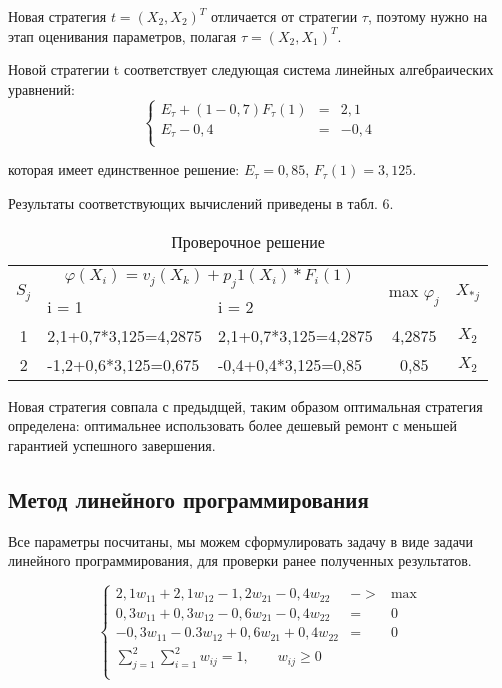 Новая стратегия $t = (X_2, X_2)^T$ отличается от стратегии $\tau$, поэтому нужно на этап оценивания параметров, полагая $\tau = (X_2, X_1)^T$.

Новой стратегии t соответствует следующая система линейных алгебраических уравнений:
$$
\left\{
	\begin{aligned}
	E_\tau + (1 - 0,7) F_\tau(1) &= & 2,1\\
	E_\tau - 0,4 &= & -0,4\\
	\end{aligned}
\right.
$$

которая имеет единственное решение: $E_\tau = 0,85$, $F_\tau(1) = 3,125$.

Результаты соответствующих вычислений приведены в табл. 6.

\begin{table}[htb]
	\begin{tabularx}{\textwidth}{|c|X|X|c|c|}
	\hline
	\multirow{2}{*}{$S_j$} & \multicolumn{2}{c|}{$\varphi (X_i )=v_j (X_k )+p_j1 (X_i)*F_i (1)$} & \multirow{2}{*}{max $\varphi_j$} & \multirow{2}{*}{$X_{*j}$} \\ 
	\hhline{~--~~}
	{} & i = 1 & i = 2 & {} & {} \\
	\hline
	1 & 2,1+0,7*3,125=4,2875 & 2,1+0,7*3,125=4,2875 & 4,2875 & $X_2$ \\
	\hline
	2 & -1,2+0,6*3,125=0,675 & -0,4+0,4*3,125=0,85 & 0,85 & $X_2$ \\
	\hline
	\end{tabularx}
\caption{Проверочное решение}
\end{table}

Новая стратегия совпала с предыдщей, таким образом оптимальная стратегия определена: оптимальнее использовать более дешевый ремонт с меньшей гарантией успешного завершения.

\subsection{Метод линейного программирования}

Все параметры посчитаны, мы можем сформулировать задачу в виде задачи линейного программирования, для проверки ранее полученных результатов.

$$
\left\{
	\begin{aligned}
	2,1w_{11}+2,1w_{12}-1,2w_{21}-0,4w_{22} & ->& \text{max}\\
	0,3w_{11}+0,3w_{12}-0,6w_{21}-0,4w_{22} & = & 0 \\
	-0,3w_{11}-0.3w_{12}+0,6w_{21}+0,4w_{22} & = & 0 \\
	\sum\limits_{j=1}^2 \sum\limits_{i=1}^2 w_{ij}=1,\qquad w_{ij} \geq 0 &&\\
	\end{aligned}
\right.
$$

